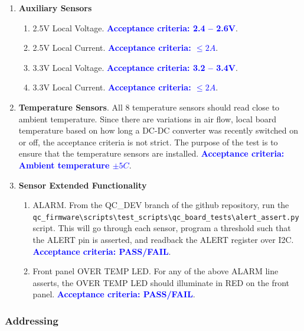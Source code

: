 \documentclass[a4paper,12pt]{article}
\begin{document}
\begin{enumerate}
\begin{enumerate}
            \end{enumerate}
        \item \textbf{Auxiliary Sensors}
            \begin{enumerate}
                \item 2.5V Local Voltage. \textcolor{blue}{\textbf{Acceptance criteria: 2.4 -- 2.6V}}.
                \item 2.5V Local Current. \textcolor{blue}{\textbf{Acceptance criteria: $\leq2A$}}.
                \item 3.3V Local Voltage. \textcolor{blue}{\textbf{Acceptance criteria: 3.2 -- 3.4V}}.
                \item 3.3V Local Current. \textcolor{blue}{\textbf{Acceptance criteria: $\leq2A$}}.
            \end{enumerate}
        \item \textbf{Temperature Sensors}. All 8 temperature sensors should read close to ambient temperature. Since there are variations in air flow, local board temperature based on how long a DC-DC converter was recently switched on or off, the acceptance criteria is not strict. The purpose of the test is to ensure that the temperature sensors are installed. \textcolor{blue}{\textbf{Acceptance criteria: Ambient temperature $\pm5C$}}.
        \item \textbf{Sensor Extended Functionality}
            \begin{enumerate}
                \item ALARM. From the QC\_DEV branch of the github repository, run the \\ 
                \verb|qc_firmware\scripts\test_scripts\qc_board_tests\alert_assert.py| script. This will go through each sensor, program a threshold such that the ALERT pin is asserted, and readback the ALERT register over I2C. \textcolor{blue}{\textbf{Acceptance criteria: PASS/FAIL}}.
                \item Front panel OVER TEMP LED. For any of the above ALARM line asserts, the OVER TEMP LED should illuminate in RED on the front panel. \textcolor{blue}{\textbf{Acceptance criteria: PASS/FAIL}}.
            \end{enumerate}
    \end{enumerate}   

\subsubsection{Addressing}
\label{section:addr_tests}
\end{document}
